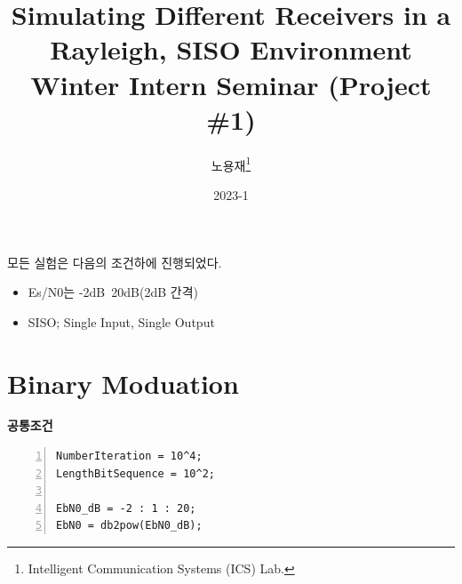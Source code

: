\documentclass{article}
\title{Simulating Different Receivers in a Rayleigh, SISO Environment\\
\large Winter Intern Seminar (Project \#1)}
\author{노용재\thanks{Intelligent Communication Systems (ICS) Lab.}}
\date{2023-1}
\newcommand{\bd}{\textbf} %
\begin{document}
\maketitle

모든 실험은 다음의 조건하에 진행되었다.

\begin{itemize}
  \item Es/N0는 -2dB~20dB(2dB 간격)
  \item SISO; Single Input, Single Output
\end{itemize}
\section{Binary Moduation}
\bd{공통조건}
\begin{lstlisting}[style=Matlab-editor,
frame=single,
numbers=left,]
NumberIteration = 10^4;
LengthBitSequence = 10^2;

EbN0_dB = -2 : 1 : 20;
EbN0 = db2pow(EbN0_dB);
\end{lstlisting}
\end{document}
